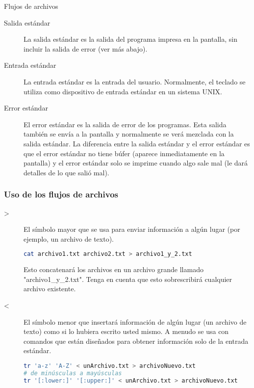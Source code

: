 \begin{frame}[c]{Flujos de archivos}
  \begin{description}
    \item[Salida estándar] 
      La salida estándar es la salida del programa impresa en la pantalla,
      sin incluir la salida de error (ver más abajo).
    \pausa
    \vspace{\baselineskip}
    \item[Entrada estándar]
      La entrada estándar es la entrada del usuario. Normalmente, el teclado
      se utiliza como dispositivo de entrada estándar en un sistema UNIX.
    \pausa
    \vspace{\baselineskip}
    \item[Error estándar]
      El error estándar es la salida de error de los programas. Esta salida
      también se envía a la pantalla y normalmente se verá mezclada con la
      salida estándar. La diferencia entre la salida estándar y el error
      estándar es que el error estándar no tiene búfer (aparece
      inmediatamente en la pantalla) y el error estándar solo se imprime
      cuando algo sale mal (le dará detalles de lo que salió mal).
  \end{description}
\end{frame}

\begin{frame}[fragile]
  \frametitle{Uso de los flujos de archivos}

  \begin{description}
    \item[>] 
      El símbolo mayor que se usa para enviar información a algún lugar
      (por ejemplo, un archivo de texto).
      
      \begin{lstlisting}[language=Bash]
cat archivo1.txt archivo2.txt > archivo1_y_2.txt
      \end{lstlisting}

      Esto concatenará los archivos en un archivo grande llamado
      "archivo1\_y\_2.txt". Tenga en cuenta que esto sobrescribirá
      cualquier archivo existente.

    \pausa
    \vspace{\baselineskip}
    \item[<]
      El símbolo menor que insertará información de algún lugar (un archivo
      de texto) como si lo hubiera escrito usted mismo. A menudo se usa con
      comandos que están diseñados para obtener información solo de la
      entrada estándar.

      \begin{lstlisting}[language=Bash]
tr 'a-z' 'A-Z' < unArchivo.txt > archivoNuevo.txt
# de minúsculas a mayúsculas
tr '[:lower:]' '[:upper:]' < unArchivo.txt > archivoNuevo.txt
      \end{lstlisting}
  \end{description}
\end{frame}

